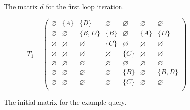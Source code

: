 \begin{figure}[h]
    \noindent
    \caption{The matrix $d$ for the first loop iteration.}
    \label{dmatrix}
\end{figure}

\begin{figure}[h]
    \[
    T_1 = \begin{pmatrix}
    \varnothing & \{A\} & \{D\} & \varnothing & \varnothing & \varnothing & \varnothing \\
    
    \varnothing & \varnothing & \{B, D\} & \{B\} & \varnothing & \{A\} & \{D\} \\
    
    \varnothing & \varnothing & \varnothing & \{C\} & \varnothing & \varnothing & \varnothing \\
    
    \varnothing & \varnothing & \varnothing & \varnothing & \{C\} & \varnothing & \varnothing \\
    
    \varnothing & \varnothing & \varnothing & \varnothing & \varnothing & \varnothing & \varnothing \\
    
    \varnothing & \varnothing & \varnothing & \varnothing & \{B\} & \varnothing & \{B, D\} \\
    
    \varnothing & \varnothing & \varnothing & \varnothing & \{C\} & \varnothing & \varnothing \\
    \end{pmatrix}
    \]
    \caption{The initial matrix for the example query.}
    \label{ConjExampleQueryFirstIteration}
\end{figure}


